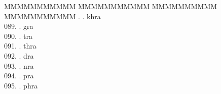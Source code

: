\begin{tabbing}
MMMMMMMMMMM \=MMMMMMMMMMM \=MMMMMMMMMM \= MMMMMMMMMMM .	. 	\> khra 	\> \bgroup\tibetan \def\u#1{\vtop{\baselineskip0pt\hbox{#1}\hbox{\tibsp\char123}}}\parindent=0pt \newbox\fillerbox\setbox\fillerbox\hbox{\vrule height0.4cm depth0.4cm width0pt}\def\filler{\copy\fillerbox}\filler\tibsp{}\tenrm\ \tibetan
\egroup  \\
089.	. 	\> gra 	\> \bgroup\tibetan \def\u#1{\vtop{\baselineskip0pt\hbox{#1}\hbox{\tibsp\char123}}}\parindent=0pt \newbox\fillerbox\setbox\fillerbox\hbox{\vrule height0.4cm depth0.4cm width0pt}\def\filler{\copy\fillerbox}\filler\tibsp{}\tenrm\ \tibetan
\egroup  \\
090.	. 	\> tra 	\> \bgroup\tibetan \def\u#1{\vtop{\baselineskip0pt\hbox{#1}\hbox{\tibsp\char123}}}\parindent=0pt \newbox\fillerbox\setbox\fillerbox\hbox{\vrule height0.4cm depth0.4cm width0pt}\def\filler{\copy\fillerbox}\filler\tibsp{}\tenrm\ \tibetan
\egroup  \\
091.	. 	\> thra 	\> \bgroup\tibetan \def\u#1{\vtop{\baselineskip0pt\hbox{#1}\hbox{\tibsp\char123}}}\parindent=0pt \newbox\fillerbox\setbox\fillerbox\hbox{\vrule height0.4cm depth0.4cm width0pt}\def\filler{\copy\fillerbox}\filler\tibsp{}\tenrm\ \tibetan
\egroup  \\
092.	. 	\> dra 	\> \bgroup\tibetan \def\u#1{\vtop{\baselineskip0pt\hbox{#1}\hbox{\tibsp\char123}}}\parindent=0pt \newbox\fillerbox\setbox\fillerbox\hbox{\vrule height0.4cm depth0.4cm width0pt}\def\filler{\copy\fillerbox}\filler\tibsp{}\tenrm\ \tibetan
\egroup  \\
093.	. 	\> nra 	\> \bgroup\tibetan \def\u#1{\vtop{\baselineskip0pt\hbox{#1}\hbox{\tibsp\char123}}}\parindent=0pt \newbox\fillerbox\setbox\fillerbox\hbox{\vrule height0.4cm depth0.4cm width0pt}\def\filler{\copy\fillerbox}\filler\tibsp{}\tenrm\ \tibetan
\egroup  \\
094.	. 	\> pra 	\> \bgroup\tibetan \def\u#1{\vtop{\baselineskip0pt\hbox{#1}\hbox{\tibsp\char123}}}\parindent=0pt \newbox\fillerbox\setbox\fillerbox\hbox{\vrule height0.4cm depth0.4cm width0pt}\def\filler{\copy\fillerbox}\filler\tibsp{}\tenrm\ \tibetan
\egroup  \\
095.	. 	\> phra 	\> \bgroup\tibetan \def\u#1{\vtop{\baselineskip0pt\hbox{#1}\hbox{\tibsp\char123}}}\parindent=0pt \newbox\fillerbox\setbox\fillerbox\hbox{\vrule height0.4cm depth0.4cm width0pt}\def\filler{\copy\fillerbox}\filler\tibsp{}\tenrm\ \tibetan

\end{tabbing}
